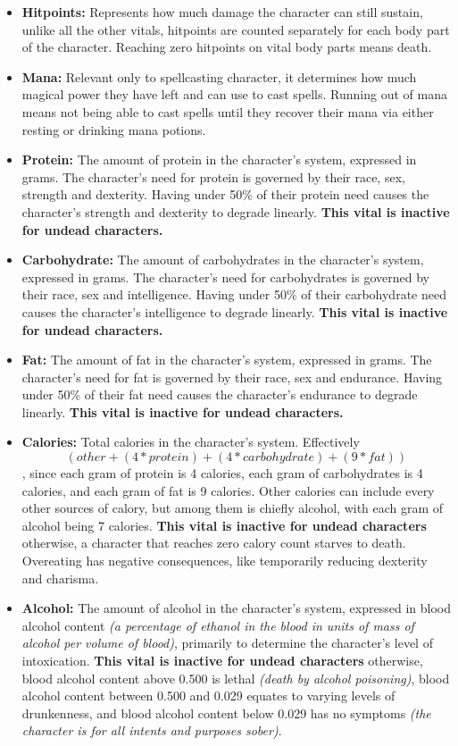 \begin{itemize}
\item \textbf{Hitpoints:} Represents how much damage the character can still sustain, unlike all the other vitals, hitpoints are counted separately for each body part of the character. Reaching zero hitpoints on vital body parts means death.
\item \textbf{Mana:} Relevant only to spellcasting character, it determines how much magical power they have left and can use to cast spells. Running out of mana means not being able to cast spells until they recover their mana via either resting or drinking mana potions.
\item \textbf{Protein:} The amount of protein in the character's system, expressed in grams. The character's need for protein is governed by their race, sex, strength and dexterity. Having under 50\% of their protein need causes the character's strength and dexterity to degrade linearly. \textbf{This vital is inactive for undead characters.}
\item \textbf{Carbohydrate:} The amount of carbohydrates in the character's system, expressed in grams. The character's need for carbohydrates is governed by their race, sex and intelligence. Having under 50\% of their carbohydrate need causes the character's intelligence to degrade linearly. \textbf{This vital is inactive for undead characters.}
\item \textbf{Fat:} The amount of fat in the character's system, expressed in grams. The character's need for fat is governed by their race, sex and endurance. Having under 50\% of their fat need causes the character's endurance to degrade linearly. \textbf{This vital is inactive for undead characters.}
\item \textbf{Calories:} Total calories in the character's system. Effectively \[(other+(4*protein)+(4*carbohydrate)+(9*fat))\], since each gram of protein is 4 calories, each gram of carbohydrates is 4 calories, and each gram of fat is 9 calories. Other calories can include every other sources of calory, but among them is chiefly alcohol, with each gram of alcohol being 7 calories. \textbf{This vital is inactive for undead characters} \textemdash otherwise, a character that reaches zero calory count starves to death. Overeating has negative consequences, like temporarily reducing dexterity and charisma.
\item \textbf{Alcohol:} The amount of alcohol in the character's system, expressed in blood alcohol content \textit{(a percentage of ethanol in the blood in units of mass of alcohol per volume of blood)}, primarily to determine the character's level of intoxication. \textbf{This vital is inactive for undead characters} \textemdash otherwise, blood alcohol content above 0.500 is lethal \textit{(death by alcohol poisoning)}, blood alcohol content between 0.500 and 0.029 equates to varying levels of drunkenness, and blood alcohol content below 0.029 has no symptoms \textit{(the character is for all intents and purposes sober)}.

\end{itemize}
